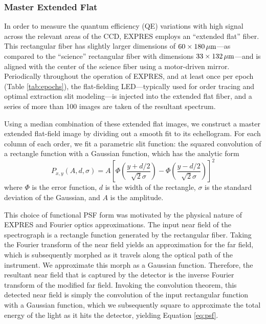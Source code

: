 \subsubsection{Master Extended Flat}\label{master-flat}

In order to measure the quantum efficiency (QE) variations with high signal across the relevant areas of the CCD, EXPRES employs an ``extended flat'' fiber. This rectangular fiber has slightly larger dimensions of $60 \times 180 {{\,\mathrm{\mu{} m}}}$---as compared to the ``science'' rectangular fiber with dimensions $33 \times 132{{\,\mathrm{\mu{} m}}}$---and is aligned with the center of the science fiber using a motor-driven mirror. Periodically throughout the operation of EXPRES, and at least once per epoch (Table \ref{tab:epochs}), the flat-fielding LED---typically used for order tracing and optimal extraction slit modeling---is injected into the extended flat fiber, and a series of more than 100 images are taken of the resultant spectrum.

Using a median combination of these extended flat images, we construct a master extended flat-field image by dividing out a smooth fit to its echellogram. For each column of each order, we fit a parametric slit function: the squared convolution of a rectangle function with a Gaussian function, which has the analytic form
\begin{equation}
    P_{x,y}(A,d,\sigma) = A \left[ \Phi \left( \frac{y+d/2}{\sqrt{2}\sigma} \right) - \Phi \left(\frac{y-d/2}{\sqrt{2}\sigma} \right) \right]^2
    \label{eq:psf}
\end{equation}
where $\Phi$ is the error function, $d$ is the width of the rectangle, $\sigma$ is the standard deviation of the Gaussian, and $A$ is the amplitude.

This choice of functional PSF form was motivated by the physical nature of EXPRES and Fourier optics approximations. The input near field of the spectrograph is a rectangle function generated by the rectangular fiber. Taking the Fourier transform of the near field yields an approximation for the far field, which is subsequently morphed as it travels along the optical path of the instrument. We approximate this morph as a Gaussian function. Therefore, the resultant near field that is captured by the detector is the inverse Fourier transform of the modified far field. Invoking the convolution theorem, this detected near field is simply the convolution of the input rectangular function with a Gaussian function, which we subsequently square to approximate the total energy of the light as it hits the detector, yielding Equation \ref{eq:psf}.

